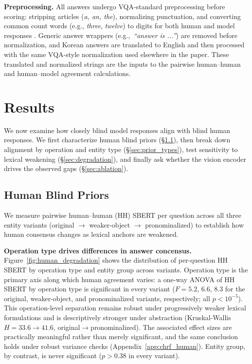 \documentclass[letterpaper]{article}
\begin{document}
\textbf{Preprocessing.} All answers undergo VQA-standard preprocessing before
scoring: stripping articles (\textit{a, an, the}), normalizing punctuation,
and converting common count words (e.g., \textit{three}, \textit{twelve}) to
digits for both human and model responses \citep{antol2015vqa}. Generic
answer wrappers (e.g.,\ \textit{``answer is ...''}) are removed before
normalization, and Korean answers are translated to English and then
processed with the same VQA-style normalization used elsewhere in the paper.
These translated and normalized strings are the inputs to the pairwise
human--human and human--model agreement calculations.



\section{Results} %
\label{sec:alignment}

We now examine how closely blind model responses align with blind human
responses. We first characterize human blind priors (\S\ref{sec:human_patterns}),
then break down alignment by operation and entity type (\S\ref{sec:prior_types}),
test sensitivity to lexical weakening (\S\ref{sec:degradation}),
and finally ask whether the vision encoder drives the observed gaps
(\S\ref{sec:ablation}).

\subsection{Human Blind Priors}
\label{sec:human_patterns}

We measure pairwise human--human (HH) SBERT per question across all
three entity variants (original $\to$ weaker-object $\to$
pronominalized) to establish how human consensus changes as lexical
anchors are weakened.

\textbf{Operation type drives differences in answer concensus.} Figure~\ref{fig:human_degradation} shows the distribution of
per-question HH SBERT by operation type and entity group across
variants. Operation type is the primary axis along which human
agreement varies: a one-way ANOVA of HH SBERT by operation type is
significant in every variant ($F{=}5.2$, $6.6$, $8.3$ for the
original, weaker-object, and pronominalized variants, respectively;
all $p{<}10^{-5}$). This operation-level separation remains robust
under progressively weaker lexical formulations and is descriptively
stronger under abstraction (Kruskal-Wallis $H{=}33.6 \to 41.6$,
original$\to$pronominalized). The associated effect sizes are practically
meaningful rather than merely significant, and the same conclusion holds under
robust variance checks (Appendix~\ref{app:chrf_human}). Entity group, by contrast, is never significant
($p{>}0.38$ in every variant).
\end{document}
